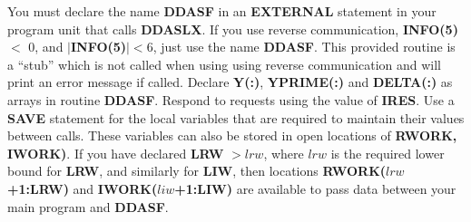 \documentclass[twoside]{MATH77}
\begin{document}
You must declare the name \textbf{DDASF} in an
\textbf{EXTERNAL} statement in your program unit that calls \textbf{DDASLX}.
If you use reverse communication, \textbf{INFO(5)} $<$ 0, and
$|$\textbf{INFO(5)}$| < 6$, just use the name \textbf{DDASF}.  This provided
routine is a ``stub'' which is not called when using using reverse
communication and will print an error message if called.
Declare \textbf{Y(:)}, \textbf{YPRIME(:)} and \textbf{DELTA(:)} as arrays in routine
\textbf{DDASF}.  Respond to requests using the value of \textbf{IRES}.  Use a
\textbf{SAVE} statement for the local variables that are required to maintain
their values between calls.  These variables can also be stored in open
locations of \textbf{RWORK, IWORK)}.  If you have declared \textbf{LRW} $> lrw$,
where $lrw$ is the required lower bound for \textbf{LRW}, and similarly for
\textbf{LIW}, then locations \textbf{RWORK($lrw$+1:LRW)} and 
\textbf{IWORK($liw$+1:LIW)} are available to pass data between your
main program and \textbf{DDASF}.\\[-5pt]
\end{document}
